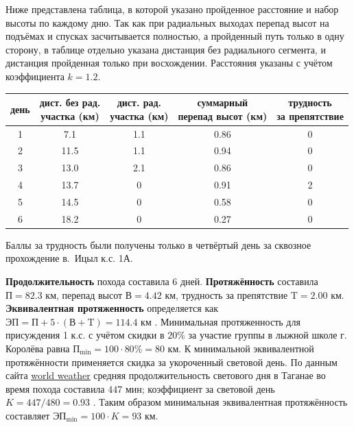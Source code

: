 Ниже представлена таблица, в которой указано пройденное расстояние и набор высоты по каждому дню. Так как при радиальных выходах перепад высот на подъёмах и спусках засчитывается полностью, а пройденный путь только в одну сторону, в таблице отдельно указана дистанция без радиального сегмента, и дистанция пройденная только при восхождении. Расстояния указаны с учётом коэффициента $k=1.2$.
\begin{table}[h!]
	\centering
	\begin{tabular}{|c|c|c|c|c|}
		\hline
		день & \shortstack{дист. без рад.\\ участка (км)} & \shortstack{дист. рад.\\ участка (км)} & \shortstack{суммарный\\ перепад высот (км)} & \shortstack{трудность\\ за препятствие} \\ \hline
		1    & 7.1                        & 1.1                    & 0.86                         & 0                        \\ \hline
		2    & 11.5                       & 1.1                    & 0.94                         & 0                        \\ \hline
		3    & 13.0                       & 2.1                    & 0.86                         & 0                        \\ \hline
		4    & 13.7                       & 0                       & 0.91                         & 2                        \\ \hline
		5    & 14.5                       & 0                       & 0.58                         & 0                        \\ \hline
		6    & 18.2                       & 0                       & 0.27                         & 0                   \\ \hline
	\end{tabular}
\end{table}

Баллы за трудность были получены только в четвёртый день за сквозное прохождение в.~Ицыл к.с. 1А.

\textbf{Продолжительность} похода составила $6$ дней. \textbf{Протяжённость} составила $\text{П} = 82.3$ км, перепад высот $\text{В} = 4.42$ км, трудность за препятствие $\text{T} = 2.00$ км. \textbf{Эквивалентная протяженность} определяется как $\text{ЭП} = \text{П} + 5 \cdot (\text{В} + \text{T}) = 114.4$ км \cite{ftsr_ski_2023}. Минимальная протяженность для присуждения 1 к.с. с учётом скидки в $20\%$ за участие группы в лыжной школе г. Королёва равна $\text{П}_{\text{min}} = 100 \cdot 80\% = 80$ км. К минимальной эквивалентной протяжённости применяется скидка за укороченный световой день. По данным сайта \href{https://world-weather.ru/pogoda/russia/taganay/sunrise/}{\color{blue}\underline{world weather}} средняя продолжительность светового дня в Таганае во время похода составила $447$ мин; коэффициент за световой день $K = 447 / 480 = 0.93$ \cite{ftsr_ski_2023}. Таким образом минимальная эквивалентная протяжённость составляет $\text{ЭП}_{\text{min}} = 100 \cdot K = 93$ км. 


\clearpage